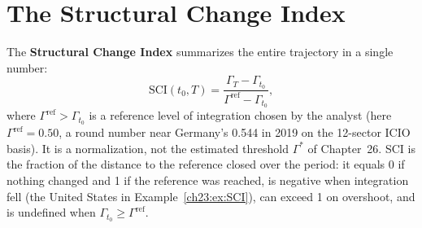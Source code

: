 \documentclass[../structural_economics_book.tex]{subfiles}
\begin{document}
\section{The Structural Change Index}
\label{ch23:sec:index}

\begin{definition}\label{ch23:def:SCI}
The \textbf{Structural Change Index} summarizes the entire trajectory in a single number:
\begin{equation}\label{ch23:eq:SCI}
\text{SCI}(t_0, T) = \frac{\Gamma_T - \Gamma_{t_0}}{\Gamma^{\text{ref}} - \Gamma_{t_0}},
\end{equation}
where $\Gamma^{\text{ref}} > \Gamma_{t_0}$ is a reference level of integration chosen by the analyst (here $\Gamma^{\text{ref}} = 0.50$, a round number near Germany's 0.544 in 2019 on the 12-sector ICIO basis). It is a normalization, not the estimated threshold $\Gamma^*$ of Chapter~26. SCI is the fraction of the distance to the reference closed over the period: it equals 0 if nothing changed and 1 if the reference was reached, is negative when integration fell (the United States in Example~\ref{ch23:ex:SCI}), can exceed 1 on overshoot, and is undefined when $\Gamma_{t_0} \ge \Gamma^{\text{ref}}$.
\end{definition}
\end{document}
